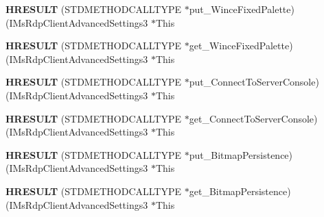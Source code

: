 \begin{DoxyCompactItemize}
\item 
\mbox{\label{struct_i_ms_rdp_client_advanced_settings3_vtbl_acd798c14987e96462807c1c0c3d547c4}} 
{\bfseries H\+R\+E\+S\+U\+LT} (S\+T\+D\+M\+E\+T\+H\+O\+D\+C\+A\+L\+L\+T\+Y\+PE $\ast$put\+\_\+\+Wince\+Fixed\+Palette)(I\+Ms\+Rdp\+Client\+Advanced\+Settings3 $\ast$This
\item 
\mbox{\label{struct_i_ms_rdp_client_advanced_settings3_vtbl_a772093606d47df53d232c243407c4993}} 
{\bfseries H\+R\+E\+S\+U\+LT} (S\+T\+D\+M\+E\+T\+H\+O\+D\+C\+A\+L\+L\+T\+Y\+PE $\ast$get\+\_\+\+Wince\+Fixed\+Palette)(I\+Ms\+Rdp\+Client\+Advanced\+Settings3 $\ast$This
\item 
\mbox{\label{struct_i_ms_rdp_client_advanced_settings3_vtbl_a5cb2b6f0701b38f88a83757cef261987}} 
{\bfseries H\+R\+E\+S\+U\+LT} (S\+T\+D\+M\+E\+T\+H\+O\+D\+C\+A\+L\+L\+T\+Y\+PE $\ast$put\+\_\+\+Connect\+To\+Server\+Console)(I\+Ms\+Rdp\+Client\+Advanced\+Settings3 $\ast$This
\item 
\mbox{\label{struct_i_ms_rdp_client_advanced_settings3_vtbl_a1d1641b79c7c5cf8c25f9c96f7731509}} 
{\bfseries H\+R\+E\+S\+U\+LT} (S\+T\+D\+M\+E\+T\+H\+O\+D\+C\+A\+L\+L\+T\+Y\+PE $\ast$get\+\_\+\+Connect\+To\+Server\+Console)(I\+Ms\+Rdp\+Client\+Advanced\+Settings3 $\ast$This
\item 
\mbox{\label{struct_i_ms_rdp_client_advanced_settings3_vtbl_a71c5797ff242f9ed8fb4dceed7adb61d}} 
{\bfseries H\+R\+E\+S\+U\+LT} (S\+T\+D\+M\+E\+T\+H\+O\+D\+C\+A\+L\+L\+T\+Y\+PE $\ast$put\+\_\+\+Bitmap\+Persistence)(I\+Ms\+Rdp\+Client\+Advanced\+Settings3 $\ast$This
\item 
\mbox{\label{struct_i_ms_rdp_client_advanced_settings3_vtbl_a4e6d8e80dba7d85a6c70778ed2659684}} 
{\bfseries H\+R\+E\+S\+U\+LT} (S\+T\+D\+M\+E\+T\+H\+O\+D\+C\+A\+L\+L\+T\+Y\+PE $\ast$get\+\_\+\+Bitmap\+Persistence)(I\+Ms\+Rdp\+Client\+Advanced\+Settings3 $\ast$This
\item 
\mbox{\label{struct_i_ms_rdp_client_advanced_settings3_vtbl_a1d88bf05c7889331aaee79f8b3cef6f1}} 

\end{DoxyCompactItemize}
